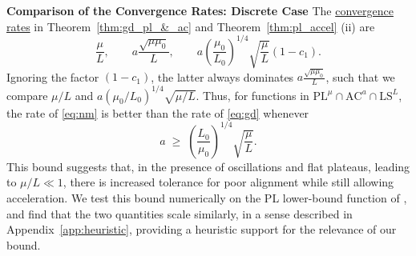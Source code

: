 \documentclass{article}
\newcommand{\jh}[1]{{\color{red} #1}}
\def\pl{{\text{PL}^\mu}}
\newcommand{\ls}{\text{LS}^{L}}
\newcommand{\ac}{\text{AC}^{a}}
\theoremstyle{plain}
\theoremstyle{definition}
\theoremstyle{remark}
\begin{document}
\noindent
\textbf{Comparison of the Convergence Rates: Discrete Case \:} The \hyperlink{cr}{convergence rates}  in Theorem~\ref{thm:gd_pl_&_ac} and Theorem~\ref{thm:pl_accel} (ii) are
\[
\frac{\mu}{L},\qquad 
a\frac{\sqrt{\mu \mu_0}}{L},\qquad 
a\!\left(\frac{\mu_0}{L_0}\right)^{1/4}\!\sqrt{\frac{\mu}{L}}(1-c_1).
\]
Ignoring the factor $(1-c_1)$, the latter always dominates $a\frac{\sqrt{\mu\mu_0}}{L}$, such that we compare $\mu/L$ and $a(\mu_0/L_0)^{1/4}\sqrt{\mu/L}$. 
Thus, for functions in $\pl\cap\ac\cap\ls$, the rate of  \eqref{eq:nm} is better than the rate of \eqref{eq:gd} whenever
\[
a \;\ge\; \left(\frac{L_0}{\mu_0}\right)^{1/4}\sqrt{\frac{\mu}{L}}.
\]
This bound suggests that, in the presence of oscillations and flat plateaus, leading to $\mu/L \ll 1$, there is increased tolerance for poor alignment while still allowing acceleration.
We test this bound numerically on the PL lower-bound function of \cite{PLlowerbound}, and find that the two quantities scale similarly, in a sense described in Appendix~\ref{app:heuristic}, providing a heuristic support for the relevance of our bound.
\end{document}
